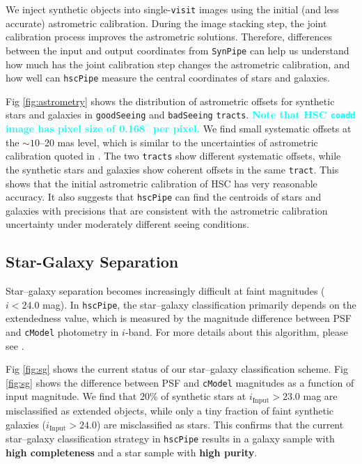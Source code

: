 \documentclass[useamsfonts]{pasj01}
\def\asec{$^{\prime\prime}$}
\def\hscpipe{\texttt{hscPipe}}
\def\synpipe{\texttt{SynPipe}}
\def\cmodel{\texttt{cModel}}
\def\coadd{\texttt{coadd}}
\def\tract{\texttt{tract}}
\def\visit{\texttt{visit}}
\def\tracts{\texttt{tracts}}
\newcommand{\song}[1]{\textcolor{cyan} {\textbf{#1}}}
\begin{document}
    We inject synthetic objects into single-\visit{} images using the initial (and 
    less accurate) astrometric calibration.
    During the image stacking step, the joint calibration process improves the
    astrometric solutions.
    Therefore, differences between the input and output coordinates from \synpipe{}
    can help us understand how much has the joint calibration step changes the 
    astrometric calibration, and how well can \hscpipe{} measure the central 
    coordinates of stars and galaxies. 

    Fig \ref{fig:astrometry} shows the distribution of astrometric offsets for 
    synthetic stars and galaxies in \texttt{goodSeeing} and \texttt{badSeeing} 
    \tracts{}.
    \song{
    Note that HSC \coadd{} image has pixel size of 0.168\asec{} per pixel. 
    }
    We find small systematic offsets at the ${\sim}10$--20 mas level, which is similar 
    to the uncertainties of astrometric calibration quoted in \citet{HSCDR1}.
    The two \tracts{} show different systematic offsets, while the synthetic stars and
    galaxies show coherent offsets in the same \tract{}.
    This shows that the initial astrometric calibration of HSC has very reasonable 
    accuracy.  
    It also suggests that \hscpipe{} can find the centroids of stars and galaxies 
    with precisions that are consistent with the astrometric calibration uncertainty
    under moderately different seeing conditions. 
    
\subsection{Star-Galaxy Separation}
    \label{ssec:sg}

    Star--galaxy separation becomes increasingly difficult at faint magnitudes 
    ($i<24.0$ mag).
    In \hscpipe{}, the star--galaxy classification primarily depends on the 
    extendedness value, which is measured by the magnitude difference between PSF and 
    \cmodel{} photometry in $i$-band.
    For more details about this algorithm, please see \citet{Bosch2017}.

    Fig \ref{fig:sg} shows the current status of our star--galaxy classification 
    scheme.  
    Fig \ref{fig:sg} shows the difference between PSF and \cmodel{} magnitudes as a 
    function of input magnitude. 
    We find that $20$\% of synthetic stars at $i_{\mathrm{Input}}>23.0$ mag are 
    misclassified as extended objects, while only a tiny fraction of faint synthetic 
    galaxies ($i_{\mathrm{Input}}>24.0$) are misclassified as stars. 
    This confirms that the current star--galaxy classification strategy in \hscpipe{}
    results in a galaxy sample with \textbf{high completeness} and a star sample
    with \textbf{high purity}.
\end{document}
